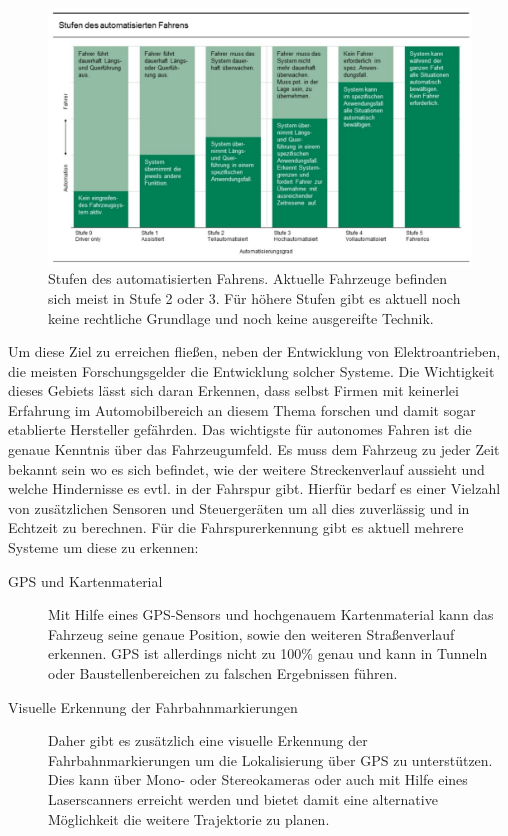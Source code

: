 \begin{figure}[t]\centering
  \includegraphics[width = 140mm]{bilder/stufen_snip.png}
  \caption{Stufen des automatisierten Fahrens. Aktuelle Fahrzeuge befinden sich meist in Stufe 2 oder 3. Für höhere Stufen gibt es aktuell noch keine rechtliche Grundlage und noch keine ausgereifte Technik. \cite{stufePic}}\label{fig:autoStufe}
\end{figure}
Um diese Ziel zu erreichen fließen, neben der Entwicklung von Elektroantrieben, die meisten Forschungsgelder die Entwicklung solcher Systeme. Die Wichtigkeit dieses Gebiets lässt sich daran Erkennen, dass selbst Firmen mit keinerlei Erfahrung im Automobilbereich an diesem Thema forschen und damit sogar etablierte Hersteller gefährden.
Das wichtigste für autonomes Fahren ist die genaue Kenntnis über das Fahrzeugumfeld. Es muss dem Fahrzeug zu jeder Zeit bekannt sein wo es sich befindet, wie der weitere Streckenverlauf aussieht und welche Hindernisse es evtl. in der Fahrspur gibt. Hierfür bedarf es einer Vielzahl von zusätzlichen Sensoren und Steuergeräten um all dies zuverlässig und in Echtzeit zu berechnen.
Für die Fahrspurerkennung gibt es aktuell mehrere Systeme um diese zu erkennen:\\
\begin{description}
\item[GPS und Kartenmaterial]
Mit Hilfe eines GPS-Sensors und hochgenauem Kartenmaterial kann das Fahrzeug seine genaue Position, sowie den weiteren Straßenverlauf erkennen. GPS ist allerdings nicht zu 100\% genau und kann in Tunneln oder Baustellenbereichen zu falschen Ergebnissen führen.
\item[Visuelle Erkennung der Fahrbahnmarkierungen]
Daher gibt es zusätzlich eine visuelle Erkennung der Fahrbahnmarkierungen um die Lokalisierung über GPS zu unterstützen. Dies kann über Mono- oder Stereokameras oder auch mit Hilfe eines Laserscanners erreicht werden und bietet damit eine alternative Möglichkeit die weitere Trajektorie zu planen. 
\end{description}
